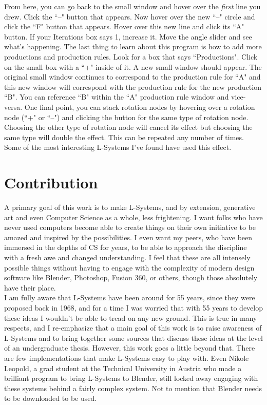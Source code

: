 \documentclass[12pt,twoside]{reedthesis}
\begin{document}
	From here, you can go back to the small window and hover over the \textit{first} line you drew. Click the ``–" button that appears. Now hover over the new ``–" circle and click the ``F" button that appears. Hover over this new line and click its ``A" button. If your Iterations box says 1, increase it. Move the angle slider and see what's happening. The last thing to learn about this program is how to add more productions and production rules. Look for a box that says ``Productions". Click on the small box with a ``+" inside of it. A new small window should appear. The original small window continues to correspond to the production rule for ``A" and this new window will correspond with the production rule for the new production ``B". You can reference ``B" within the ``A" production rule window and vice-versa. One final point, you can stack rotation nodes by hovering over a rotation node (``+" or ``–") and clicking the button for the same type of rotation node. Choosing the other type of rotation node will cancel its effect but choosing the same type will double the effect. This can be repeated any number of times. Some of the most interesting L-Systems I've found have used this effect.\\

\chapter{Contribution}
	A primary goal of this work is to make L-Systems, and by extension, generative art and even Computer Science as a whole, less frightening. I want folks who have never used computers become able to create things on their own initiative to be amazed and inspired by the possibilities. I even want my peers, who have been immersed in the depths of CS for years, to be able to approach the discipline with a fresh awe and changed understanding. I feel that these are all intensely possible things without having to engage with the complexity of modern design software like Blender, Photoshop, Fusion 360, or others, though those absolutely have their place.\\
	
	I am fully aware that L-Systems have been around for 55 years, since they were proposed back in 1968, and for a time I was worried that with 55 years to develop these ideas I wouldn't be able to tread on any new ground. This is true in many respects, and I re-emphasize that a main goal of this work is to raise awareness of L-Systems and to bring together some sources that discuss these ideas at the level of an undergraduate thesis. However, this work goes a little beyond that. There are few implementations that make L-Systems easy to play with. Even Nikole Leopold, a grad student at the Technical University in Austria who made a brilliant program to bring L-Systems to Blender, still locked away engaging with these systems behind a fairly complex system. Not to mention that Blender needs to be downloaded to be used.\\
	
\end{document}
